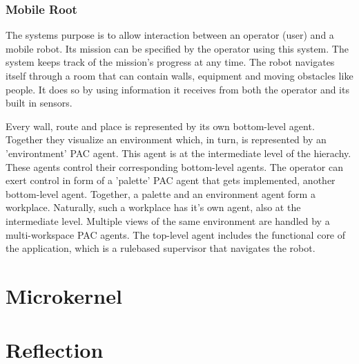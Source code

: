\documentclass{scrbook}
\begin{document}
\subsection{Mobile Root}

The systems purpose is to allow interaction between an operator (user) and a mobile robot. Its mission can be
specified by the operator using this system. The system keeps track of the mission's progress at any time.
The robot navigates itself through a room that can contain walls, equipment and moving obstacles like people.
It does so by using information it receives from both the operator and its built in sensors.

Every wall, route and place is represented by its own bottom-level agent. Together they visualize an
environment which, in turn, is represented by an 'environtment' PAC agent. This agent is at the intermediate
level of the hierachy. These agents control their corresponding bottom-level agents.
The operator can exert control in form of a 'palette' PAC agent that gets implemented, another bottom-level
agent.
Together, a palette and an environment agent form a workplace. Naturally, such a workplace has it's own
agent, also at the intermediate level.
Multiple views of the same environment are handled by a multi-workspace PAC agents.
The top-level agent includes the functional core of the application, which is a rulebased supervisor that
navigates the robot.


\theendnotes





\chapter{Microkernel}
\chapter{Reflection}
\end{document}
